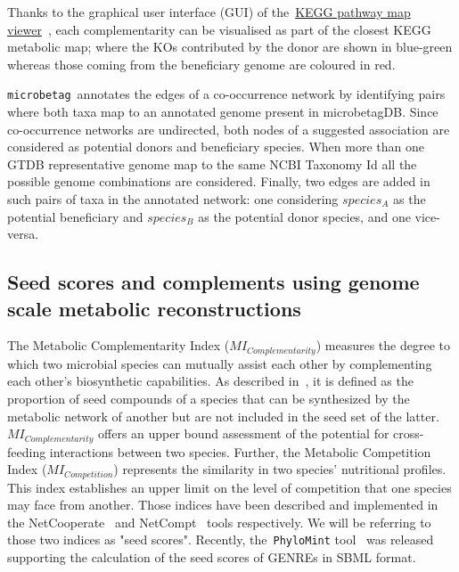 \documentclass[sn-mathphys,Numbered]{sn-jnl}  %
\theoremstyle{thmstyleone}%
\theoremstyle{thmstyletwo}%
\theoremstyle{thmstylethree}%
\newcommand{\microbetag}{\texttt{microbetag}}
\begin{document}
        Thanks to the graphical user interface (GUI) of the~\href{https://www.kegg.jp/kegg/docs/color_gui.html}{KEGG pathway map viewer}~\cite{kanehisa2020kegg,kanehisa2022kegg}, 
        each complementarity can be visualised as part of the closest KEGG metabolic map; 
        where the KOs contributed by the donor are shown in blue-green whereas those coming from the beneficiary genome are coloured in red.

        \microbetag~annotates the edges of a co-occurrence network by identifying pairs where both taxa map to an annotated genome present in microbetagDB.
        Since co-occurrence networks are undirected, both nodes of a suggested association are considered as potential donors and beneficiary species. 
        When more than one GTDB representative genome map to the same NCBI Taxonomy Id all the possible genome combinations are considered.
        Finally, two edges are added in such pairs of taxa in the annotated network: 
        one considering $species_A$ as the potential beneficiary and $species_B$ as the potential donor species, and one vice-versa. 


    \subsection*{Seed scores and complements using genome scale metabolic reconstructions }
    \label{subsec:seeds}

        The Metabolic Complementarity Index ($MI_{Complementarity}$) measures the degree to which two microbial species can mutually assist each other by complementing each other's biosynthetic capabilities.
        As described in~\cite{phylomint_ms}, it is defined as the proportion of seed compounds of a species that can be synthesized by the metabolic network of another but are not included in the seed set of the latter. 
        $MI_{Complementarity}$ offers an upper bound assessment of the potential for cross-feeding interactions between two species.
        Further, the Metabolic Competition Index ($MI_{Competition}$) represents the similarity in two species' nutritional profiles. 
        This index establishes an upper limit on the level of competition that one species may face from another.
        Those indices have been described and implemented in the NetCooperate~\cite{levy2015netcooperate} and NetCompt~\cite{kreimer2012netcmpt} tools respectively.
        We will be referring to those two indices as "seed scores".
        Recently, the~\texttt{PhyloMint} tool~\cite{phylomint_ms} was released supporting the calculation of the seed scores of GENREs in SBML format.
\end{document}
